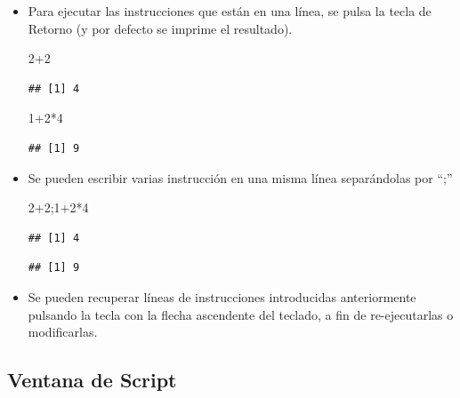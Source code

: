 \documentclass[
]{book}
\newenvironment{Shaded}{\begin{snugshade}}{\end{snugshade}}
\newcommand{\DecValTok}[1]{\textcolor[rgb]{0.00,0.00,0.81}{#1}}
\newcommand{\NormalTok}[1]{#1}
\newcommand{\SpecialCharTok}[1]{\textcolor[rgb]{0.00,0.00,0.00}{#1}}
\theoremstyle{break}
\begin{document}
\begin{itemize}
\item
  Para ejecutar las instrucciones que están en una línea, se pulsa la
  tecla de Retorno (y por defecto se imprime el resultado).

\begin{Shaded}
\begin{Highlighting}[]
\DecValTok{2}\SpecialCharTok{+}\DecValTok{2}
\end{Highlighting}
\end{Shaded}

\begin{verbatim}
## [1] 4
\end{verbatim}

\begin{Shaded}
\begin{Highlighting}[]
\DecValTok{1}\SpecialCharTok{+}\DecValTok{2}\SpecialCharTok{*}\DecValTok{4}
\end{Highlighting}
\end{Shaded}

\begin{verbatim}
## [1] 9
\end{verbatim}
\item
  Se pueden escribir varias instrucción en una misma línea
  separándolas por ``;''

\begin{Shaded}
\begin{Highlighting}[]
\DecValTok{2}\SpecialCharTok{+}\DecValTok{2}\NormalTok{;}\DecValTok{1}\SpecialCharTok{+}\DecValTok{2}\SpecialCharTok{*}\DecValTok{4}
\end{Highlighting}
\end{Shaded}

\begin{verbatim}
## [1] 4
\end{verbatim}

\begin{verbatim}
## [1] 9
\end{verbatim}
\item
  Se pueden recuperar líneas de instrucciones introducidas
  anteriormente pulsando la tecla con la flecha ascendente del
  teclado, a fin de re-ejecutarlas o modificarlas.
\end{itemize}

\hypertarget{ventana-de-script}{%
\subsection{Ventana de Script}\label{ventana-de-script}}
\end{document}

